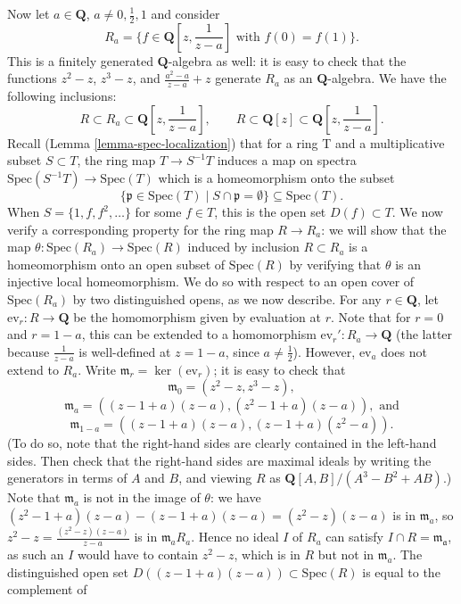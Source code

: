 \begin{example}
\medskip\noindent Now let $a \in \mathbf{Q}$, $a \neq0,\frac{1}{2},1$ and
consider
$$
R_a = \{ f \in \mathbf{Q}[z, \frac{1}{z-a}]\text{ with }f(0) = f(1)
\}.
$$
This is a finitely generated $\mathbf{Q}$-algebra as well: it is
easy to check that the functions $z^2-z$, $z^3-z$, and
$\frac{a^2-a}{z-a}+z$ generate $R_a$ as an $\mathbf{Q}$-algebra.  We
have the following inclusions:
$$
R\subset R_a\subset\mathbf{Q}[z,\frac{1}{z-a}],\qquad
R\subset\mathbf{Q}[z]\subset\mathbf{Q}[z,\frac{1}{z-a}].
$$
Recall (Lemma \ref{lemma-spec-localization}) that for a ring T and a
multiplicative subset $S\subset T$, the ring map $T\to S^{-1}T$
induces a map on spectra $\text{Spec}(S^{-1}T)\to\text{Spec}(T)$
which is a homeomorphism onto the subset
$$
\{\mathfrak p \in \text{Spec}(T) \mid S \cap \mathfrak p = \emptyset
\}\subseteq\text{Spec}(T).
$$
When $S=\lbrace 1,f,f^2,\ldots\rbrace$ for some $f\in T$, this is
the open set $D(f)\subset T$.  We now verify a corresponding
property for the ring map $R\to R_a$: we will show that the map
$\theta:\text{Spec}(R_a)\to\text{Spec}(R)$ induced by inclusion
$R\subset R_a$ is a homeomorphism onto an open subset of
$\text{Spec}(R)$ by verifying that $\theta$ is an injective local
homeomorphism.  We do so with respect to an open cover of
$\text{Spec}(R_a)$ by two distinguished opens, as we now describe.
For any $r\in\mathbf{Q}$, let $\text{ev}_r:R\to\mathbf{Q}$ be the
homomorphism given by evaluation at $r$.  Note that for $r=0$ and
$r=1-a$, this can be extended to a homomorphism
$\text{ev}_r':R_a\to\mathbf{Q}$ (the latter because $\frac{1}{z-a}$
is well-defined at $z=1-a$, since $a\neq\frac{1}{2}$).  However,
$\text{ev}_a$ does not extend to $R_a$.  Write
$\mathfrak{m}_r=\ker(\text{ev}_r)$; it is easy to check that
$$
\mathfrak{m}_0=(z^2-z,z^3-z),
$$
$$
\mathfrak{m}_a=((z-1+a)(z-a),(z^2-1+a)(z-a)),\text{ and}
$$
$$
\mathfrak{m}_{1-a}=((z-1+a)(z-a),(z-1+a)(z^2-a)).
$$
(To do so, note that the right-hand sides are clearly contained in
the left-hand sides.  Then check that the right-hand sides are
maximal ideals by writing the generators in terms of $A$ and $B$,
and viewing $R$ as $\mathbf{Q}[A,B]/(A^3-B^2+AB)$.) Note that
$\mathfrak{m}_a$ is not in the image of $\theta$: we have
$(z^2-1+a)(z-a)-(z-1+a)(z-a)=(z^2-z)(z-a)$ is in $\mathfrak{m}_a$,
so $z^2-z=\frac{(z^2-z)(z-a)}{z-a}$ is in $\mathfrak{m}_aR_a$. Hence
no ideal $I$ of $R_a$ can satisfy $I\cap R=\mathfrak{m_a}$, as such
an $I$ would have to contain $z^2-z$, which is in $R$ but not in
$\mathfrak{m}_a$.  The distinguished open set
$D((z-1+a)(z-a))\subset\text{Spec}(R)$ is equal to the complement of

\end{example}
